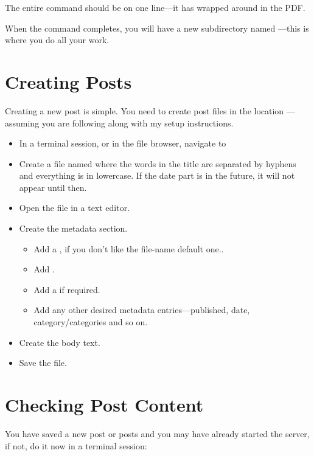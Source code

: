 The entire  command should be on one line---it has wrapped around in the PDF.

When the command completes, you will have a new subdirectory named ---this is where you do all your work.

\section{Creating Posts}

Creating a new post is simple. You need to create post files in the location ---assuming you are following along with my setup instructions.

\begin{itemize}
    \item In a terminal session, or in the file browser, navigate to 
    \item Create a file named  where the words in the title are separated by hyphens and everything is in lowercase. If the date part is in the future, it will not appear until then.
    \item Open the file in a text editor.
    \item Create the metadata section.
    \begin{itemize}
        \item Add a , if you don't like the file-name default one..
        \item Add .
        \item Add a  if required.
        \item Add any other desired metadata entries---published, date, category/categories and so on.
    \end{itemize}
    \item Create the body text.
    \item Save the file.
\end{itemize}

\section{Checking Post Content}

You have saved a new post or posts and you may have already started the server, if not, do it now in a terminal session:

